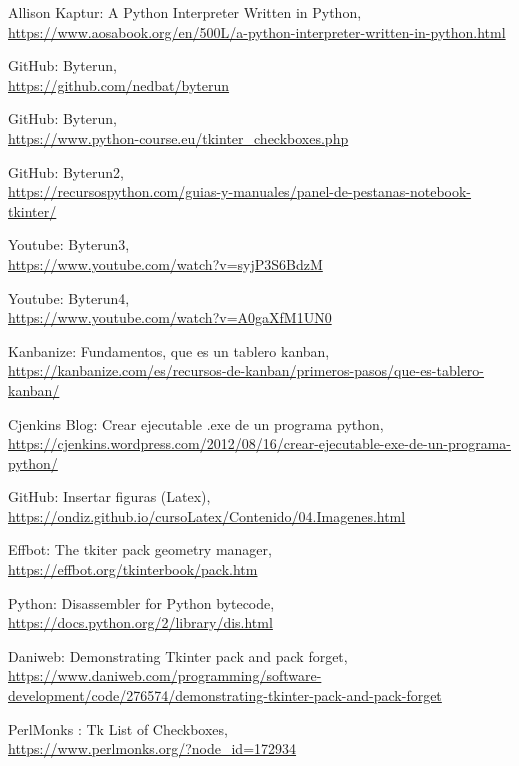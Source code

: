 \documentclass[a4paper,12pt,twoside]{memoir}
\begin{document}
\begin{thebibliography}{8}

Allison Kaptur: A Python Interpreter Written in Python,
\\\url{https://www.aosabook.org/en/500L/a-python-interpreter-written-in-python.html}

GitHub: Byterun,
\\\url{https://github.com/nedbat/byterun}

GitHub: Byterun,
\\\url{https://www.python-course.eu/tkinter_checkboxes.php}

GitHub: Byterun2,
\\\url{https://recursospython.com/guias-y-manuales/panel-de-pestanas-notebook-tkinter/}

Youtube: Byterun3,
\\\url{https://www.youtube.com/watch?v=syjP3S6BdzM}

Youtube: Byterun4,
\\\url{https://www.youtube.com/watch?v=A0gaXfM1UN0}

Kanbanize: Fundamentos, que es un tablero kanban,
\\\url{https://kanbanize.com/es/recursos-de-kanban/primeros-pasos/que-es-tablero-kanban/}

Cjenkins Blog: Crear ejecutable .exe de un programa python,
\\\url{https://cjenkins.wordpress.com/2012/08/16/crear-ejecutable-exe-de-un-programa-python/}

GitHub: Insertar figuras (Latex),
\\\url{https://ondiz.github.io/cursoLatex/Contenido/04.Imagenes.html}

Effbot: The tkiter pack geometry manager,
\\\url{https://effbot.org/tkinterbook/pack.htm}

Python: Disassembler for Python bytecode,
\\\url{https://docs.python.org/2/library/dis.html}

Daniweb: Demonstrating Tkinter pack and pack forget,
\\\url{https://www.daniweb.com/programming/software-development/code/276574/demonstrating-tkinter-pack-and-pack-forget}

PerlMonks : Tk List of Checkboxes,
\\\url{https://www.perlmonks.org/?node_id=172934}


\end{thebibliography}
\end{document}
